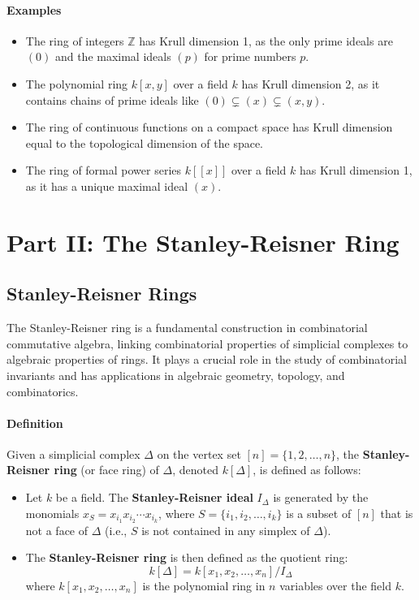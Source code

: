 \documentclass[12pt]{article}
\theoremstyle{definition}
\numberwithin{equation}{subsection}
\begin{document}
\paragraph{Examples}
\begin{itemize}
\item The ring of integers $\mathbb{Z}$ has Krull dimension 1, as the only prime ideals are $(0)$ and the maximal ideals $(p)$ for prime numbers $p$.
\item The polynomial ring $k[x,y]$ over a field $k$ has Krull dimension 2, as it contains chains of prime ideals like $(0) \subsetneq (x) \subsetneq (x,y)$.
\item The ring of continuous functions on a compact space has Krull dimension equal to the topological dimension of the space.
\item The ring of formal power series $k[[x]]$ over a field $k$ has Krull dimension 1, as it has a unique maximal ideal $(x)$.
\end{itemize}

\section*{Part II: The Stanley-Reisner Ring}
\subsection{Stanley-Reisner Rings}
The Stanley-Reisner ring is a fundamental construction in combinatorial commutative algebra, linking combinatorial properties of simplicial complexes to algebraic properties of rings. It plays a crucial role in the study of combinatorial invariants and has applications in algebraic geometry, topology, and combinatorics.
\paragraph{Definition}
Given a simplicial complex $\Delta$ on the vertex set $[n] = \{1, 2, \ldots, n\}$, the \textbf{Stanley-Reisner ring} (or face ring) of $\Delta$, denoted $k[\Delta]$, is defined as follows:
\begin{itemize}
\item Let $k$ be a field. The \textbf{Stanley-Reisner ideal} $I_\Delta$ is generated by the monomials $x_S = x_{i_1} x_{i_2} \cdots x_{i_k}$, where $S = \{i_1, i_2, \ldots, i_k\}$ is a subset of $[n]$ that is not a face of $\Delta$ (i.e., $S$ is not contained in any simplex of $\Delta$).
\item The \textbf{Stanley-Reisner ring} is then defined as the quotient ring:
\[
k[\Delta] = k[x_1, x_2, \ldots, x_n]/I_\Delta
\]
where $k[x_1, x_2, \ldots, x_n]$ is the polynomial ring in $n$ variables over the field $k$.
\end{itemize}
\end{document}
